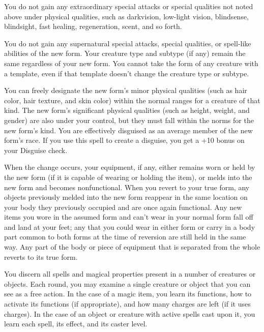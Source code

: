\begin{multicols}{2}
\begin{small}
\smallskip\noindent You do not gain any extraordinary special attacks or special qualities not noted above under physical qualities, such as darkvision, low-light vision, blindsense, blindsight, fast healing, regeneration, scent, and so forth.

\smallskip\noindent You do not gain any supernatural special attacks, special qualities, or spell-like abilities of the new form. Your creature type and subtype (if any) remain the same regardless of your new form. You cannot take the form of any creature with a template, even if that template doesn't change the creature type or subtype.

\smallskip\noindent You can freely designate the new form's minor physical qualities (such as hair color, hair texture, and skin color) within the normal ranges for a creature of that kind. The new form's significant physical qualities (such as height, weight, and gender) are also under your control, but they must fall within the norms for the new form's kind. You are effectively disguised as an average member of the new form's race. If you use this spell to create a disguise, you get a +10 bonus on your Disguise check.

\smallskip\noindent When the change occurs, your equipment, if any, either remains worn or held by the new form (if it is capable of wearing or holding the item), or melds into the new form and becomes nonfunctional. When you revert to your true form, any objects previously melded into the new form reappear in the same location on your body they previously occupied and are once again functional. Any new items you wore in the assumed form and can't wear in your normal form fall off and land at your feet; any that you could wear in either form or carry in a body part common to both forms at the time of reversion are still held in the same way. Any part of the body or piece of equipment that is separated from the whole reverts to its true form.

\noindent You discern all spells and magical properties present in a number of creatures or objects. Each round, you may examine a single creature or object that you can see as a free action. In the case of a magic item, you learn its functions, how to activate its functions (if appropriate), and how many charges are left (if it uses charges). In the case of an object or creature with active spells cast upon it, you learn each spell, its effect, and its caster level.


\end{small}
\end{multicols}
